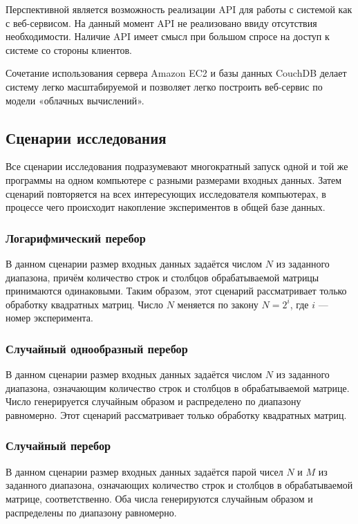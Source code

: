 Перспективной является возможность реализации API для работы с системой как с веб-сервисом. На данный момент API не реализовано ввиду отсутствия необходимости. Наличие API имеет смысл при большом спросе на доступ к системе со стороны клиентов.

Сочетание использования сервера Amazon EC2 и базы данных CouchDB делает систему легко масштабируемой и позволяет легко построить веб-сервис по модели «облачных вычислений».

\subsection{Сценарии исследования}

Все сценарии исследования подразумевают многократный запуск одной и той же программы на одном компьютере с разными размерами входных данных. Затем сценарий повторяется на всех интересующих исследователя компьютерах, в процессе чего происходит накопление экспериментов в общей базе данных.

\subsubsection{Логарифмический перебор}

В данном сценарии размер входных данных задаётся числом $N$ из заданного диапазона, причём количество строк и столбцов обрабатываемой матрицы принимаются одинаковыми. Таким образом, этот сценарий рассматривает только обработку квадратных матриц. Число $N$ меняется по закону $N = 2 ^ i$, где $i$ --- номер эксперимента.

\subsubsection{Случайный однообразный перебор}
В данном сценарии размер входных данных задаётся числом $N$ из заданного диапазона, означающим количество строк и столбцов в обрабатываемой матрице. Число генерируется случайным образом и распределено по диапазону равномерно. Этот сценарий рассматривает только обработку квадратных матриц. 

\subsubsection{Случайный перебор}
\label{random-exploration}

В данном сценарии размер входных данных задаётся парой чисел $N$ и $M$ из заданного диапазона, означающих количество строк и столбцов в обрабатываемой матрице, соответственно. Оба числа генерируются случайным образом и распределены по диапазону равномерно.

